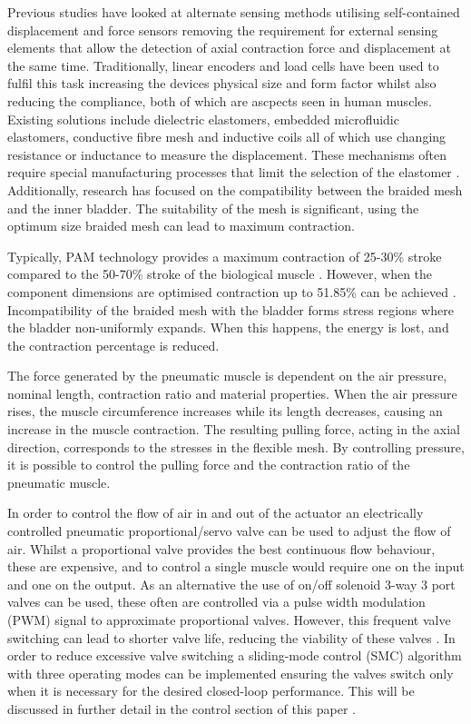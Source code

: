 \documentclass[11pt,a4paper]{article}
\begin{document}
Previous studies have looked at alternate sensing methods utilising self-contained displacement and force sensors removing the requirement for external sensing elements that allow the detection of axial contraction force and displacement at the same time. Traditionally, linear encoders and load cells have been used to fulfil this task increasing the devices physical size and form factor whilst also reducing the compliance, both of which are ascpects seen in human muscles. Existing solutions include dielectric elastomers, embedded microfluidic elastomers, conductive fibre mesh and inductive coils all of which use changing resistance or inductance to measure the displacement. These mechanisms often require special manufacturing processes that limit the selection of the elastomer \cite{erin_pol_valle_park_2016}. 
Additionally, research has focused on the compatibility between the braided mesh and the inner bladder. The suitability of the mesh is significant, using the optimum size braided mesh can lead to maximum contraction. 

Typically, PAM technology provides a maximum contraction of 25-30\% stroke compared to the 50-70\% stroke of the biological muscle \cite{andrikopoulos_nikolakopoulos_2017}. However, when the component dimensions are optimised contraction up to 51.85\% can be achieved \cite{najmuddin_mustaffa_2017}. Incompatibility of the braided mesh with the bladder forms stress regions where the bladder non-uniformly expands. When this happens, the energy is lost, and the contraction percentage is reduced. \newline

The force generated by the pneumatic muscle is dependent on the air pressure, nominal length, contraction ratio and material properties. When the air pressure rises, the muscle circumference increases while its length decreases, causing an increase in the muscle contraction. The resulting pulling force, acting in the axial direction, corresponds to the stresses in the flexible mesh. By controlling pressure, it is possible to control the pulling force and the contraction ratio of the pneumatic muscle. \newline

In order to control the flow of air in and out of the actuator an electrically controlled pneumatic proportional/servo valve can be used to adjust the flow of air. Whilst a proportional valve provides the best continuous flow behaviour, these are expensive, and to control a single muscle would require one on the input and one on the output. As an alternative the use of on/off solenoid 3-way 3 port valves can be used, these often are controlled via a pulse width modulation (PWM) signal to approximate proportional valves. However, this frequent valve switching can lead to shorter valve life, reducing the viability of these valves \cite{zhang_bone_2018}. In order to reduce excessive valve switching a sliding-mode control (SMC) algorithm with three operating modes can be implemented ensuring the valves switch only when it is necessary for the desired closed-loop performance. This will be discussed in further detail in the control section of this paper . \newline
\end{document}
